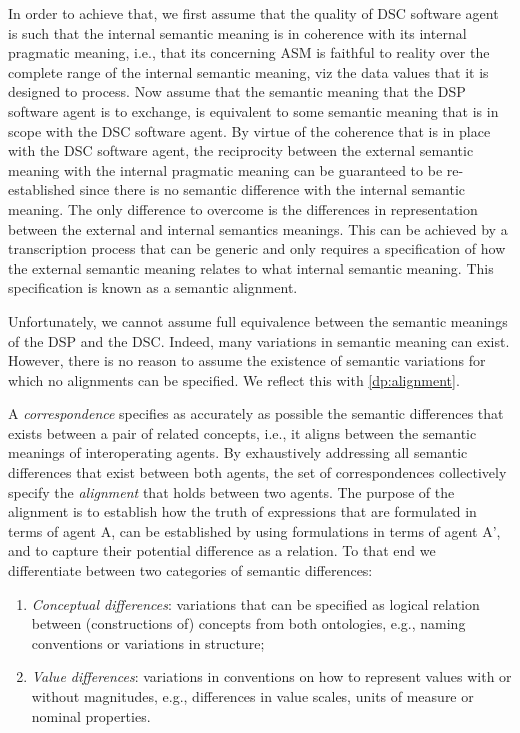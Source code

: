 \documentclass[sort&compress,preprint,authoryear,3p,twocolumn]{elsarticle}
\providecommand{\tightlist}{%
  \setlength{\itemsep}{0pt}\setlength{\parskip}{0pt}}
\begin{document}
In order to achieve that, we first assume that the quality of DSC
software agent is such that the internal semantic meaning is in
coherence with its internal pragmatic meaning, i.e., that its concerning
ASM is faithful to reality over the complete range of the internal
semantic meaning, viz the data values that it is designed to process.
Now assume that the semantic meaning that the DSP software agent is to
exchange, is equivalent to some semantic meaning that is in scope with
the DSC software agent. By virtue of the coherence that is in place with
the DSC software agent, the reciprocity between the external semantic
meaning with the internal pragmatic meaning can be guaranteed to be
re-established since there is no semantic difference with the internal
semantic meaning. The only difference to overcome is the differences in
representation between the external and internal semantics meanings.
This can be achieved by a transcription process that can be generic and
only requires a specification of how the external semantic meaning
relates to what internal semantic meaning. This specification is known
as a semantic alignment.

Unfortunately, we cannot assume full equivalence between the semantic
meanings of the DSP and the DSC. Indeed, many variations in semantic
meaning can exist. However, there is no reason to assume the existence
of semantic variations for which no alignments can be specified. We
reflect this with \cref{dp:alignment}.

A \emph{correspondence} specifies as accurately as possible the semantic
differences that exists between a pair of related concepts, i.e., it
aligns between the semantic meanings of interoperating agents. By
exhaustively addressing all semantic differences that exist between both
agents, the set of correspondences collectively specify the
\emph{alignment} that holds between two agents. The purpose of the
alignment is to establish how the truth of expressions that are
formulated in terms of agent A, can be established by using formulations
in terms of agent A', and to capture their potential difference as a
relation. To that end we differentiate between two categories of
semantic differences:

\begin{enumerate}
\def\labelenumi{\arabic{enumi}.}
\tightlist
\item
  \emph{Conceptual differences}: variations that can be specified as
  logical relation between (constructions of) concepts from both
  ontologies, e.g., naming conventions or variations in structure;
\item
  \emph{Value differences}: variations in conventions on how to
  represent values with or without magnitudes, e.g., differences in
  value scales, units of measure or nominal properties.
\end{enumerate}
\end{document}
